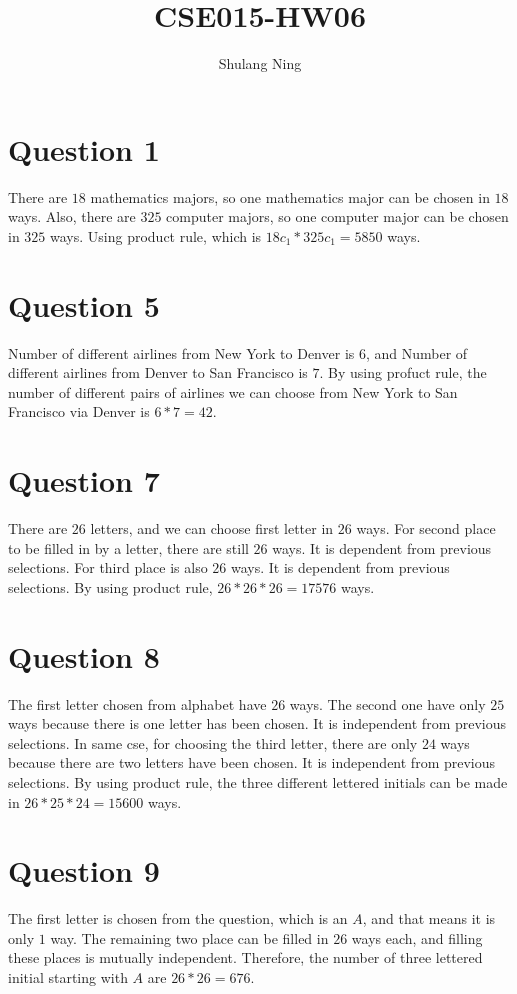 \documentclass[11pt]{article}
\title{CSE015-HW06}
\author{Shulang Ning}
\begin{document}
        
    \maketitle
    
    \section{Question 1}
        There are $18$ mathematics majors, so one mathematics major can be chosen in $18$ ways. Also, there are $325$ computer majors, so one computer major can be chosen in $325$ ways. Using product rule, which is $18c_1 * 325c_1 = 5850$ ways.

    \section{Question 5}
        Number of different airlines from New York to Denver is $6$, and Number of different airlines from Denver to San Francisco is $7$. By using profuct rule, the number of different pairs of airlines we can choose from New York to San Francisco via Denver is $6 * 7 = 42$.

    \section{Question 7}
        There are $26$ letters, and we can choose first letter in $26$ ways. For second place to be filled in by a letter, there are still $26$ ways. It is dependent from previous selections. For third place is also $26$ ways. It is dependent from previous selections. By using product rule, $26 * 26 * 26 = 17576$ ways.
    
    \section{Question 8}
        The first letter chosen from alphabet have $26$ ways. The second one have only $25$ ways because there is one letter has been chosen. It is independent from previous selections. In same cse, for choosing the third letter, there are only $24$ ways because there are two letters have been chosen. It is independent from previous selections. By using product rule, the three different lettered initials can be made in $26 * 25 * 24 = 15600$ ways. 
    
    \section{Question 9}
        The first letter is chosen from the question, which is an $A$, and that means it is only $1$ way. The remaining two place can be filled in $26$ ways each, and filling these places is mutually independent. Therefore, the number of three lettered initial starting with $A$ are $26 * 26 = 676$.
\end{document}
